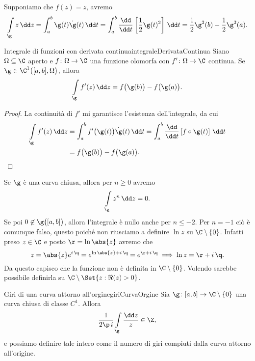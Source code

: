 \begin{ese}
	Supponiamo che \(f(z)=z\), avremo
	\[
		\int\limits_\g z\,\dd z = \int_a^b \g(t) \dot{\g}(t)\,\dd t = \int_a^b \frac{\dd}{\dd t} \left[ \frac{1}{2}\g(t)^2 \right] \,\dd t = \frac{1}{2}\g^2(b)-\frac{1}{2}\g^2(a).
	\]
\end{ese}

\begin{prop}{Integrale di funzioni con derivata continua}{integraleDerivataContinua}
	Siano \(\Omega\subseteq \C\) aperto e \(f\colon \Omega \to \C\) una funzione olomorfa con \(f'\colon \Omega \to \C\) continua.
	Se \(\g\in\C^1\big([a,b],\Omega\big)\), allora
	\[
		\int\limits_\g f'(z)\,\dd z = f\big(\g(b)\big)-f\big(\g(a)\big).
	\]
\end{prop}

\begin{proof}
	La continuità di \(f'\) mi garantisce l'esistenza dell'integrale, da cui
	\[
		\begin{split}
			\int\limits_\g f'(z)\,\dd z & = \int_a^b f'\big(\g(t)\big)\dot{\g}(t)\,\dd t = \int_a^b \frac{\dd}{\dd t}\left[ f\circ \g(t) \right] \,\dd t\\
			& = f\big(\g(b)\big) - f\big(\g(a)\big).\qedhere
		\end{split}
	\]
\end{proof}

\begin{ese}
	Se \(\g\) è una curva chiusa, allora per \(n\ge 0\) avremo
	\[
		\int\limits_\g z^n\,\dd z = 0.
	\]
	Se poi \(0\not\in \g\big([a,b]\big)\), allora l'integrale è nullo anche per \(n\le -2\).
	Per \(n=-1\) ciò è comunque falso, questo poiché non riusciamo a definire \(\ln z\) su \(\C\setminus\{0\}\).
	Infatti preso \(z\in \C\) e posto \(\r = \ln \abs{z}\) avremo che
	\[
		z = \abs{z}e^{i\,\q} = e^{\ln \abs{z}+i\,\q} = e^{\r +i\,\q} \implies \ln z = \r + i\,\q.
	\]
	Da questo capisco che la funzione non è definita in \(\C\setminus \{0\}\).
	Volendo sarebbe possibile definirla su \(\C\setminus\Set{z:\Re(z) >0}\).
\end{ese}

\begin{prop}{Giri di una curva attorno all'orgine}{giriCurvaOrgine}
	Sia \(\g\colon [a,b] \to \C\setminus\{0\}\) una curva chiusa di classe \(C^1\).
	Allora
	\[
		\frac{1}{2\p\,i} \int\limits_\g \frac{\dd z}{z} \in \Z,
	\]
	e possiamo definire tale intero come il numero di giri compiuti dalla curva attorno all'origine.
\end{prop}

